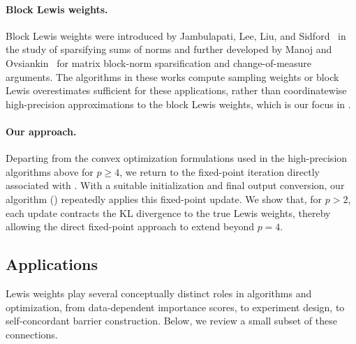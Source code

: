 \documentclass[11pt]{article}
\theoremstyle{plain}
\numberwithin{equation}{section}
\begin{document}
\paragraph{Block Lewis weights.}
Block Lewis weights were introduced by Jambulapati, Lee, Liu, and Sidford~\cite{jambulapati2023sparsifying} in the study of sparsifying sums of norms and further developed by Manoj and Ovsiankin~\cite{manoj2025change} for matrix block-norm sparsification and change-of-measure arguments. 
The algorithms in these works compute sampling weights or block Lewis overestimates sufficient for these applications, rather than coordinatewise high-precision approximations to the block Lewis weights, which is our focus in .

\paragraph{Our approach.}
Departing from the convex optimization formulations used in the high-precision algorithms above for $p\geq4$, we return to the fixed-point iteration directly associated with . 
With a suitable initialization and final output conversion, our algorithm () repeatedly applies this fixed-point update. 
We show that, for $p>2$, each update contracts the KL divergence to the true Lewis weights, thereby allowing the direct fixed-point approach to extend beyond $p=4$.

\subsection{Applications}\label{sec:apps}

Lewis weights play several conceptually distinct roles in algorithms and optimization, from data-dependent importance scores, to experiment design, to self-concordant barrier construction. Below, we review a small subset of these connections. 

 
 
\end{document}
